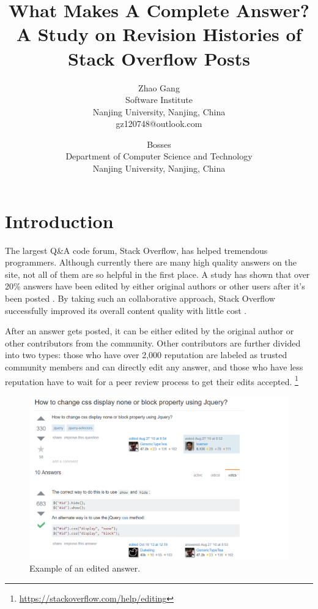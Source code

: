 \documentclass[10pt,conference]{IEEEtran}
\begin{document}
\title{What Makes A Complete Answer? A Study on Revision Histories of Stack Overflow Posts}
\author{Zhao Gang\\
Software Institute\\
Nanjing University, Nanjing, China\\
gz120748@outlook.com \and
Bosses\\
Department of Computer Science and Technology\\
Nanjing University, Nanjing, China\\
}
\maketitle

\section {Introduction}

The largest Q\&A code forum, Stack Overflow, has helped tremendous programmers.
Although currently there are many high quality answers on the site, not all of them are so helpful in the first place.
A study has shown that over 20\% answers have been edited by either original authors or other users after it's been posted \cite{7208aa781175403f9c3aaddc19f3b8cf}.
By taking such an collaborative approach, Stack Overflow successfully improved its overall content quality with little cost \cite{Chen:2017:CCD:3171581.3134667}.

After an answer gets posted, it can be either edited by the original author or other contributors from the community. 
Other contributors are further divided into two types: those who have over 2,000 reputation are labeled as trusted community members and can directly edit any answer, and those who have less reputation have to wait for a peer review process to get their edits accepted.%
\footnote{\url{https://stackoverflow.com/help/editing}}

\begin{figure}
  \includegraphics[width=\linewidth]{figure1.png}
  \caption{Example of an edited answer.}
  \label{fig:jqueryAnswer}
\end{figure}
\end{document}
